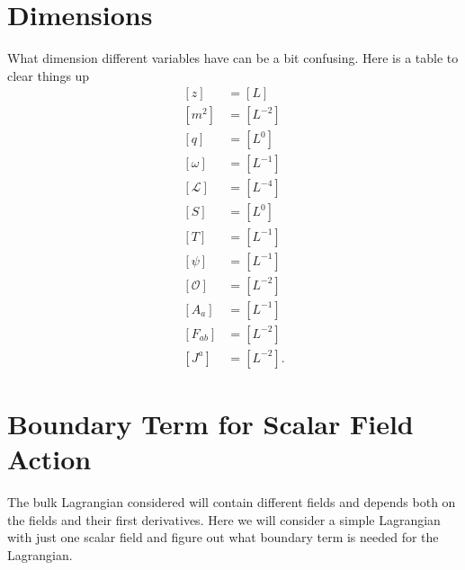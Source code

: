 \documentclass[12pt]{report}
\begin{document}
\begin{appendices}
\chapter{Dimensions}
What dimension different variables have can be a bit confusing. Here is a table to clear things up
\begin{equation}
 \begin{split}
[z]&=[L]\\
[m^2]&=[L^{-2}]\\
[q]&=[L^{0}]\\
[\omega]&=[L^{-1}]\\
[\mathcal{L}]&=[L^{-4}]\\
[S]&=[L^0]\\
[T]&=[L^{-1}]\\
[\psi]&=[L^{-1}]\\
[\mathcal{O}]&=[L^{-2}]\\
[A_a]&=[L^{-1}]\\
[F_{ab}]&=[L^{-2}]\\
[J^a]&=[L^{-2}].
 \end{split}
\end{equation}


\chapter{Boundary Term for Scalar Field Action \label{a:bound}}
The bulk Lagrangian considered will contain different fields and depends both on the fields and their first derivatives. Here we will consider a simple Lagrangian with just one scalar field and figure out what boundary term is needed for the Lagrangian.\\


\end{appendices}
\end{document}
